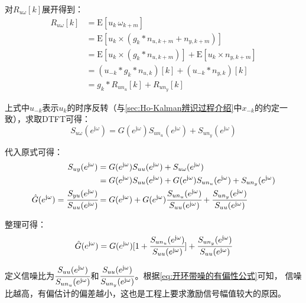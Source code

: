 对\(R_{u\omega}[k]\)展开得到：
\begin{align*}
    R_{u\omega}[k] &= \text{E}[u_k\,\omega_{k+m}]\\
    &= \text{E}[u_k\times(g_k*n_{u,k+m}+n_{y,k+m})]\\
    &= \text{E}[u_k\times(g_k*n_{u,k+m})]+\text{E}[u_k\times n_{y,k+m}]\\
    &= (u_{-k}*g_k*n_{u,k})[k]+(u_{-k}*n_{y,k})[k]\\
    &= g_k*R_{un_u}[k]+R_{un_y}[k]
\end{align*}

上式中\(u_{-k}\)表示\(u_k\)的时序反转（与\ref{sec:Ho-Kalman辨识过程介绍}中\(x_{-k}\)的约定一致），求取DTFT可得：
\begin{equation*}
    S_{u\omega}(e^{\mathrm{j}\omega})=G(e^{\mathrm{j}\omega})S_{un_u}(e^{\mathrm{j}\omega})+S_{un_y}(e^{\mathrm{j}\omega})
\end{equation*}

代入原式可得：
\begin{align*}
    S_{uy}(e^{\mathrm{j}\omega})&=G(e^{\mathrm{j}\omega})S_{uu}(e^{\mathrm{j}\omega})+S_{u\omega}(e^{\mathrm{j}\omega})\\
    &= G(e^{\mathrm{j}\omega})S_{uu}(e^{\mathrm{j}\omega})+G(e^{\mathrm{j}\omega})S_{un_u}(e^{\mathrm{j}\omega})+S_{un_y}(e^{\mathrm{j}\omega})\\
    \hat{G}(e^{\mathrm{j}\omega})=\cfrac{S_{yu}(e^{\mathrm{j}\omega})}{S_{uu}(e^{\mathrm{j}\omega})}&=G(e^{\mathrm{j}\omega})+G(e^{\mathrm{j}\omega})\cfrac{S_{un_u}(e^{\mathrm{j}\omega})}{S_{uu}(e^{\mathrm{j}\omega})}+\cfrac{S_{un_y}(e^{\mathrm{j}\omega})}{S_{uu}(e^{\mathrm{j}\omega})}
\end{align*}

整理可得：
\begin{equation}
    \hat{G}(e^{\mathrm{j}\omega})=G(e^{\mathrm{j}\omega})[1+\cfrac{S_{un_u}(e^{\mathrm{j}\omega})}{S_{uu}(e^{\mathrm{j}\omega})}]+\cfrac{S_{un_y}(e^{\mathrm{j}\omega})}{S_{uu}(e^{\mathrm{j}\omega})}
    \label{eq:开环带噪的有偏性公式}
\end{equation}

定义信噪比为\(\cfrac{S_{uu}(e^{\mathrm{j}\omega})}{S_{un_u}(e^{\mathrm{j}\omega})}\)和\(\cfrac{S_{uu}(e^{\mathrm{j}\omega})}{S_{un_y}(e^{\mathrm{j}\omega})}\)。根据\ref{eq:开环带噪的有偏性公式}可知，
信噪比越高，有偏估计的偏差越小，这也是工程上要求激励信号幅值较大的原因。